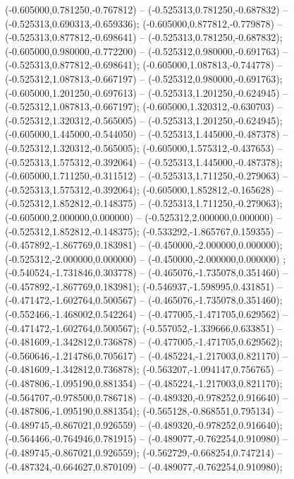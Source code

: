 (-0.605000,0.781250,-0.767812) -- (-0.525313,0.781250,-0.687832) -- (-0.525313,0.690313,-0.659336);
 (-0.605000,0.877812,-0.779878) -- (-0.525313,0.877812,-0.698641) -- (-0.525313,0.781250,-0.687832);
 (-0.605000,0.980000,-0.772200) -- (-0.525312,0.980000,-0.691763) -- (-0.525313,0.877812,-0.698641);
 (-0.605000,1.087813,-0.744778) -- (-0.525312,1.087813,-0.667197) -- (-0.525312,0.980000,-0.691763);
 (-0.605000,1.201250,-0.697613) -- (-0.525313,1.201250,-0.624945) -- (-0.525312,1.087813,-0.667197);
 (-0.605000,1.320312,-0.630703) -- (-0.525312,1.320312,-0.565005) -- (-0.525313,1.201250,-0.624945);
 (-0.605000,1.445000,-0.544050) -- (-0.525313,1.445000,-0.487378) -- (-0.525312,1.320312,-0.565005);
 (-0.605000,1.575312,-0.437653) -- (-0.525313,1.575312,-0.392064) -- (-0.525313,1.445000,-0.487378);
 (-0.605000,1.711250,-0.311512) -- (-0.525313,1.711250,-0.279063) -- (-0.525313,1.575312,-0.392064);
 (-0.605000,1.852812,-0.165628) -- (-0.525312,1.852812,-0.148375) -- (-0.525313,1.711250,-0.279063);
 (-0.605000,2.000000,0.000000) -- (-0.525312,2.000000,0.000000) -- (-0.525312,1.852812,-0.148375);
 (-0.533292,-1.865767,0.159355) -- (-0.457892,-1.867769,0.183981) -- (-0.450000,-2.000000,0.000000);
 (-0.525312,-2.000000,0.000000) -- (-0.450000,-2.000000,0.000000) ;
 (-0.540524,-1.731846,0.303778) -- (-0.465076,-1.735078,0.351460) -- (-0.457892,-1.867769,0.183981);
 (-0.546937,-1.598995,0.431851) -- (-0.471472,-1.602764,0.500567) -- (-0.465076,-1.735078,0.351460);
 (-0.552466,-1.468002,0.542264) -- (-0.477005,-1.471705,0.629562) -- (-0.471472,-1.602764,0.500567);
 (-0.557052,-1.339666,0.633851) -- (-0.481609,-1.342812,0.736878) -- (-0.477005,-1.471705,0.629562);
 (-0.560646,-1.214786,0.705617) -- (-0.485224,-1.217003,0.821170) -- (-0.481609,-1.342812,0.736878);
 (-0.563207,-1.094147,0.756765) -- (-0.487806,-1.095190,0.881354) -- (-0.485224,-1.217003,0.821170);
 (-0.564707,-0.978500,0.786718) -- (-0.489320,-0.978252,0.916640) -- (-0.487806,-1.095190,0.881354);
 (-0.565128,-0.868551,0.795134) -- (-0.489745,-0.867021,0.926559) -- (-0.489320,-0.978252,0.916640);
 (-0.564466,-0.764946,0.781915) -- (-0.489077,-0.762254,0.910980) -- (-0.489745,-0.867021,0.926559);
 (-0.562729,-0.668254,0.747214) -- (-0.487324,-0.664627,0.870109) -- (-0.489077,-0.762254,0.910980);
